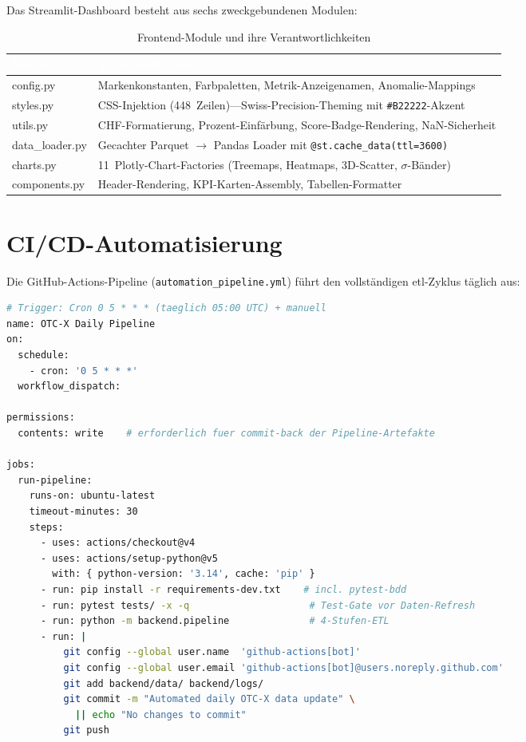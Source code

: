 \documentclass[11pt, a4paper, oneside, openany]{report}
\newcommand{\code}[1]{\texttt{\small\textcolor{DeepNavy}{#1}}}
\begin{document}
Das Streamlit-Dashboard besteht aus sechs zweckgebundenen Modulen:

\begin{table}[H]
\centering
\caption{Frontend-Module und ihre Verantwortlichkeiten}
\label{tab:frontend}
\sffamily\small
\begin{tabularx}{\textwidth}{>{\ttfamily}l X}
  \toprule
  \rowcolor{DeepNavy} \textcolor{white}{\textbf{Modul}} & \textcolor{white}{\textbf{Verantwortlichkeit}} \\
  \midrule
  config.py       & Markenkonstanten, Farbpaletten, Metrik-Anzeigenamen, Anomalie-Mappings \\
  styles.py       & CSS-Injektion (448~Zeilen)\;---\;Swiss-Precision-Theming mit \code{\#B22222}-Akzent \\
  utils.py        & CHF-Formatierung, Prozent-Einfärbung, Score-Badge-Rendering, NaN-Sicherheit \\
  data\_loader.py & Gecachter Parquet $\to$ Pandas Loader mit \code{@st.cache\_data(ttl=3600)} \\
  charts.py       & 11~Plotly-Chart-Factories (Treemaps, Heatmaps, 3D-Scatter, $\sigma$-Bänder) \\
  components.py   & Header-Rendering, KPI-Karten-Assembly, Tabellen-Formatter \\
  \bottomrule
\end{tabularx}
\end{table}

\section{CI/CD-Automatisierung}

Die GitHub-Actions-Pipeline (\code{automation\_pipeline.yml}) führt den vollständigen \gls{etl}-Zyklus täglich aus:

\begin{lstlisting}[language=bash, caption={CI/CD-Ablauf (vereinfacht)}]
# Trigger: Cron 0 5 * * * (taeglich 05:00 UTC) + manuell
name: OTC-X Daily Pipeline
on:
  schedule:
    - cron: '0 5 * * *'
  workflow_dispatch:

permissions:
  contents: write    # erforderlich fuer commit-back der Pipeline-Artefakte

jobs:
  run-pipeline:
    runs-on: ubuntu-latest
    timeout-minutes: 30
    steps:
      - uses: actions/checkout@v4
      - uses: actions/setup-python@v5
        with: { python-version: '3.14', cache: 'pip' }
      - run: pip install -r requirements-dev.txt    # incl. pytest-bdd
      - run: pytest tests/ -x -q                     # Test-Gate vor Daten-Refresh
      - run: python -m backend.pipeline              # 4-Stufen-ETL
      - run: |
          git config --global user.name  'github-actions[bot]'
          git config --global user.email 'github-actions[bot]@users.noreply.github.com'
          git add backend/data/ backend/logs/
          git commit -m "Automated daily OTC-X data update" \
            || echo "No changes to commit"
          git push
\end{lstlisting}
\end{document}
